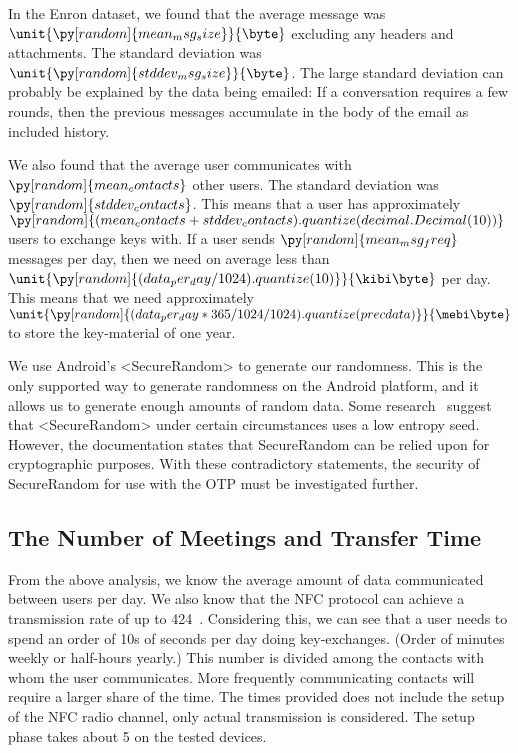 In the Enron dataset, we found that the average message was
\(\unit{\py[random]{mean_msg_size}}{\byte}\)
excluding any headers and attachments.
The standard deviation was
\(\unit{\py[random]{stddev_msg_size}}{\byte}\).
The large standard deviation can probably be explained by the data being 
emailed:
If a conversation requires a few rounds, then the previous messages accumulate 
in the body of the email as included history.

We also found that the average user communicates with
\(\py[random]{mean_contacts}\)
other users.
The standard deviation was
\(\py[random]{stddev_contacts}\).
This means that a user has approximately
\(\py[random]{(mean_contacts 
+ stddev_contacts).quantize(decimal.Decimal(10))}\)
users to exchange keys with.
If a user sends
\(\py[random]{mean_msg_freq}\)
messages per day, then we need on average less than
\(\unit{\py[random]{(data_per_day/1024).quantize( 10 )}}{\kibi\byte}\)
per day.
This means that we need approximately
\(\unit{\py[random]{(data_per_day*365/1024/1024).quantize( precdata 
      )}}{\mebi\byte}\) to store the key-material of one year.


We use Android's <SecureRandom> to generate our randomness.
This is the only supported way to generate randomness on the Android platform, 
and it allows us to generate enough amounts of random data.
Some research~\cite{AndroidLowEntropyMyth,JavaRandomness} suggest that 
<SecureRandom> under certain circumstances uses a low entropy seed.
However, the documentation states that SecureRandom can be relied upon for 
cryptographic purposes.
With these contradictory statements, the security of SecureRandom for use with 
the \ac{OTP} must be investigated further.

\subsection{The Number of Meetings and Transfer Time}
\label{NumberOfMeetings}
From the above analysis, we know the average amount of data communicated 
between users per day.
We also know that the \ac{NFC} protocol can achieve a transmission rate of up 
to \unit{424}{\kilo\bit\per\second}~\cite{NFCController}.
Considering this, we can see that a user needs to spend an order of 10s of 
seconds per day doing key-exchanges.
(Order of minutes weekly or half-hours yearly.)
This number is divided among the contacts with whom the user communicates.
More frequently communicating contacts will require a larger share of the time.
The times provided does not include the setup of the \ac{NFC} radio channel, 
only actual transmission is considered.
The setup phase takes about \unit{5}{\second} on the tested devices.

